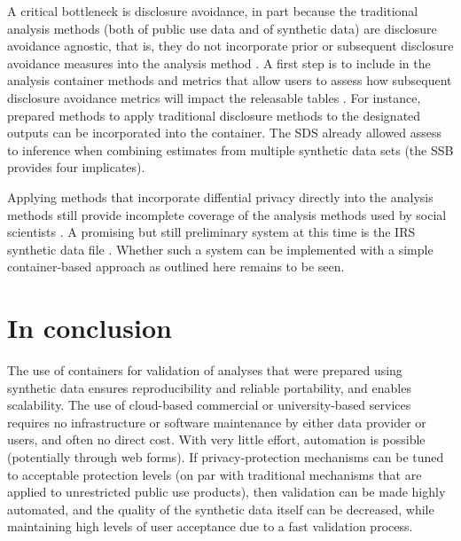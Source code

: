 \documentclass[inline]{hdsr}
\begin{document}
A critical bottleneck is disclosure avoidance, in part because the traditional analysis methods (both of public use data and of synthetic data) are disclosure avoidance agnostic, that is, they do not incorporate prior or subsequent disclosure avoidance measures into the analysis method \citep{AbowdSchmutte_BPEA2015}. A first step is to include in the analysis container methods and metrics that allow users to assess how subsequent disclosure avoidance metrics will impact the releasable tables \citep{ReiterJPC2010}. For instance, prepared methods to apply traditional disclosure methods to the designated outputs \citep[aggregation, suppression, rounding, see][]{brandt_guidelines_2010} can be incorporated into the container. The \ac{SDS} already allowed assess to inference when combining estimates from multiple synthetic data sets (the \ac{SSB} provides four implicates). 

Applying methods that incorporate diffential privacy directly into the analysis methods \citep{alabi_hypothesis_2022,alabi_differentially_2023,chaudhuri_privacy-preserving_2008,alabi_differentially_2020,sheffet_differentially_2019} still provide incomplete coverage of the analysis methods used by social scientists \citep[see ][ for an overview]{barrientos_differentially_2021}. A promising but still preliminary system at this time is the IRS synthetic data file 
\citep{burman2018,tyagi_privacy-preserving_2024}. Whether such a system can be implemented with a simple container-based approach as outlined here remains to be seen. 

\section{In conclusion}

The use of containers for validation of analyses that were prepared using synthetic data ensures reproducibility and reliable portability, and enables scalability. The use of cloud-based commercial or university-based services requires no infrastructure or software maintenance by either data provider or users, and often no direct cost.  With very little effort, automation is possible (potentially through web forms).  If   privacy-protection mechanisms can be tuned to acceptable protection levels (on par with traditional mechanisms that are applied to unrestricted public use products), then validation can be made highly automated, and the quality of the synthetic data itself can be decreased, while maintaining high levels of user acceptance due to a fast validation process.
\end{document}
